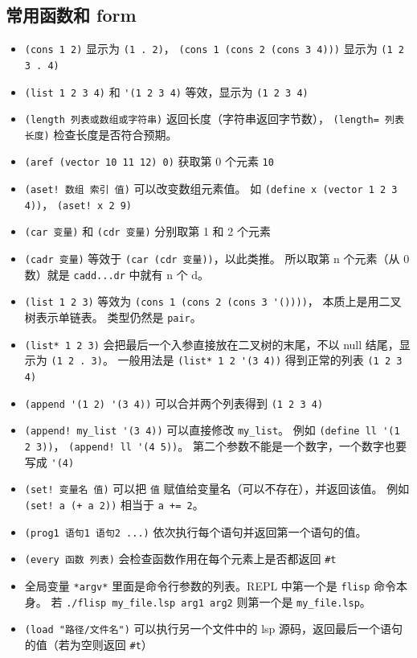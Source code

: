 \subsection{常用函数和 form}
\begin{itemize}
\item \verb`(cons 1 2)` 显示为 \verb`(1 . 2)`， \verb`(cons 1 (cons 2 (cons 3 4)))` 显示为 \verb`(1 2 3 . 4)`
\item \verb`(list 1 2 3 4)` 和 \verb`'(1 2 3 4)` 等效，显示为 \verb`(1 2 3 4)`
\item \verb`(length 列表或数组或字符串)` 返回长度（字符串返回字节数）， \verb`(length= 列表 长度)` 检查长度是否符合预期。
\item \verb`(aref (vector 10 11 12) 0)` 获取第 0 个元素 \verb`10`
\item \verb`(aset! 数组 索引 值)` 可以改变数组元素值。 如 \verb`(define x (vector 1 2 3 4))`， \verb`(aset! x 2 9)`
\item \verb`(car 变量)` 和 \verb`(cdr 变量)` 分别取第 1 和 2 个元素
\item \verb`(cadr 变量)` 等效于 \verb`(car (cdr 变量))`，以此类推。 所以取第 n 个元素（从 0 数）就是 \verb`cadd...dr` 中就有 n 个 d。
\item \verb`(list 1 2 3)` 等效为 \verb`(cons 1 (cons 2 (cons 3 '())))`， 本质上是用二叉树表示单链表。 类型仍然是 \verb`pair`。
\item \verb`(list* 1 2 3)` 会把最后一个入参直接放在二叉树的末尾，不以 null 结尾，显示为 \verb`(1 2 . 3)`。 一般用法是 \verb`(list* 1 2 '(3 4))` 得到正常的列表 \verb`(1 2 3 4)`
\item \verb`(append '(1 2) '(3 4))` 可以合并两个列表得到 \verb`(1 2 3 4)`
\item \verb`(append! my_list '(3 4))` 可以直接修改 \verb`my_list`。 例如 \verb`(define ll '(1 2 3))`， \verb`(append! ll '(4 5))`。 第二个参数不能是一个数字，一个数字也要写成 \verb`'(4)`
\item \verb`(set! 变量名 值)` 可以把 \verb`值` 赋值给变量名（可以不存在），并返回该值。 例如 \verb`(set! a (+ a 2))` 相当于 \verb`a += 2`。
\item \verb`(prog1 语句1 语句2 ...)` 依次执行每个语句并返回第一个语句的值。
\item \verb`(every 函数 列表)` 会检查函数作用在每个元素上是否都返回 \verb`#t`
\item 全局变量 \verb`*argv*` 里面是命令行参数的列表。REPL 中第一个是 \verb`flisp` 命令本身。 若 \verb`./flisp my_file.lsp arg1 arg2` 则第一个是 \verb`my_file.lsp`。
\item \verb`(load "路径/文件名")` 可以执行另一个文件中的 lsp 源码，返回最后一个语句的值（若为空则返回 \verb`#t`）

\end{itemize}
